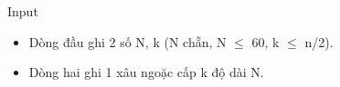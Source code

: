 Input
\begin{itemize}
	\item Dòng đầu ghi 2 số N, k (N chẵn, N  $\le$  60, k  $\le$  n/2).
	\item Dòng hai ghi 1 xâu ngoặc cấp k độ dài N.
\end{itemize}